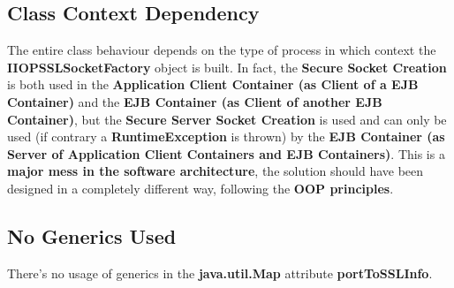 \subsection{Class Context Dependency}
The entire class behaviour depends on the type of process in which context the \textbf{IIOPSSLSocketFactory} object is built.
In fact, the \textbf{Secure Socket Creation} is both used in the \textbf{Application Client Container (as Client of a EJB Container)} and the \textbf{EJB Container (as Client of another EJB Container)}, but the \textbf{Secure Server Socket Creation} is used and can only be used (if contrary a \textbf{RuntimeException} is thrown) by the \textbf{EJB Container (as Server of Application Client Containers and EJB Containers)}.
This is a \textbf{major mess in the software architecture}, the solution should have been designed in a completely different way, following the \textbf{OOP principles}.

\subsection{No Generics Used}
There's no usage of generics in the \textbf{java.util.Map} attribute \textbf{portToSSLInfo}.
